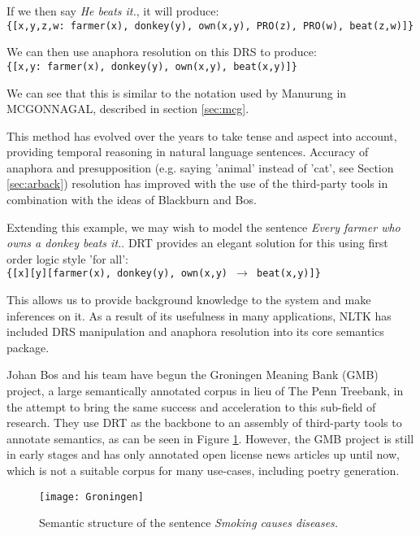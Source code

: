 If we then say \textit{He beats it.}, it will produce:\\
\texttt{\{[x,y,z,w: farmer(x), donkey(y), own(x,y), PRO(z), PRO(w), beat(z,w)]\}}

We can then use anaphora resolution on this DRS to produce:\\
\texttt{\{[x,y: farmer(x), donkey(y), own(x,y), beat(x,y)]\}}

We can see that this is similar to the notation used by Manurung in MCGONNAGAL, described in section \ref{sec:mcg}.

This method has evolved over the years to take tense and aspect into account, providing temporal reasoning in natural language sentences. Accuracy of anaphora and presupposition (e.g. saying 'animal' instead of 'cat', see Section \ref{sec:arback}) resolution has improved with the use of the third-party tools in combination with the ideas of Blackburn and Bos\cite{blackburn2008computational}.

Extending this example, we may wish to model the sentence \textit{Every farmer who owns a donkey beats it.}. DRT provides an elegant solution for this using first order logic style 'for all':\\
\texttt{\{[x][y][farmer(x), donkey(y), own(x,y) $\rightarrow$ beat(x,y)]\}}

This allows us to provide background knowledge to the system and make inferences on it. As a result of its usefulness in many applications, NLTK has included DRS manipulation and anaphora resolution into its core semantics package.

Johan Bos and his team have begun the Groningen Meaning Bank (GMB) project\cite{BasileBosEvangVenhuizen2012LREC}, a large semantically annotated corpus in lieu of The Penn Treebank, in the attempt to bring the same success and acceleration to this sub-field of research. They use DRT as the backbone to an assembly of third-party tools to annotate semantics, as can be seen in Figure \ref{fig:gmb}. However, the GMB project is still in early stages and has only annotated open license news articles up until now, which is not a suitable corpus for many use-cases, including poetry generation.

\begin{figure}[h!]
\centering
\texttt{[image: Groningen]}
\caption{Semantic structure of the sentence \textit{Smoking causes diseases.}}
\label{fig:gmb}
\end{figure}

